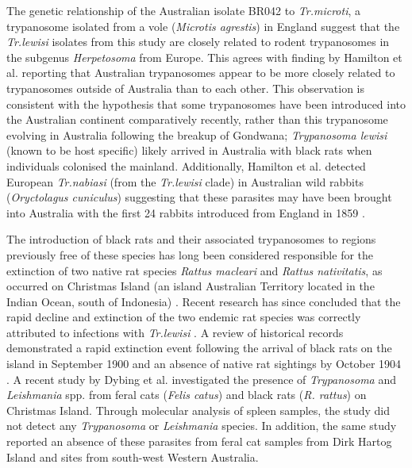 \documentclass[a4paper, nobind]{templates/ociamthesis}
\begin{document}
The genetic relationship of the Australian isolate BR042 to \emph{Tr.microti}, a trypanosome isolated from a vole (\emph{Microtis agrestis}) in England suggest that the \emph{Tr.lewisi} isolates from this study are closely related to rodent trypanosomes in the subgenus \emph{Herpetosoma} from Europe. This agrees with finding by Hamilton et al. \autocite*{hamiltonEvolutionTrypanosomaCruzi2012} reporting that Australian trypanosomes appear to be more closely related to trypanosomes outside of Australia than to each other. This observation is consistent with the hypothesis that some trypanosomes have been introduced into the Australian continent comparatively recently, rather than this trypanosome evolving in Australia following the breakup of Gondwana; \emph{Trypanosoma lewisi} (known to be host specific) likely arrived in Australia with black rats when individuals colonised the mainland. Additionally, Hamilton et al. \autocite*{hamiltonInadvertentIntroductionAustralia2005} detected European \emph{Tr.nabiasi} (from the \emph{Tr.lewisi} clade) in Australian wild rabbits (\emph{Oryctolagus cuniculus}) suggesting that these parasites may have been brought into Australia with the first 24 rabbits introduced from England in 1859 \autocite{hamiltonInadvertentIntroductionAustralia2005}.

The introduction of black rats and their associated trypanosomes to regions previously free of these species has long been considered responsible for the extinction of two native rat species \emph{Rattus macleari} and \emph{Rattus nativitatis}, as occurred on Christmas Island (an island Australian Territory located in the Indian Ocean, south of Indonesia) \autocite{wyattHistoricalMammalExtinction2008}. Recent research has since concluded that the rapid decline and extinction of the two endemic rat species was correctly attributed to infections with \emph{Tr.lewisi} \autocite{wyattHistoricalMammalExtinction2008}. A review of historical records demonstrated a rapid extinction event following the arrival of black rats on the island in September 1900 and an absence of native rat sightings by October 1904 \autocite{greenMammalExtinctionIntroduced2014}. A recent study by Dybing et al. \autocite*{dybingGhostsChristmasAbsence2016} investigated the presence of \emph{Trypanosoma} and \emph{Leishmania} spp. from feral cats (\emph{Felis catus}) and black rats (\emph{R. rattus}) on Christmas Island. Through molecular analysis of spleen samples, the study did not detect any \emph{Trypanosoma} or \emph{Leishmania} species. In addition, the same study reported an absence of these parasites from feral cat samples from Dirk Hartog Island and sites from south-west Western Australia.
\end{document}
